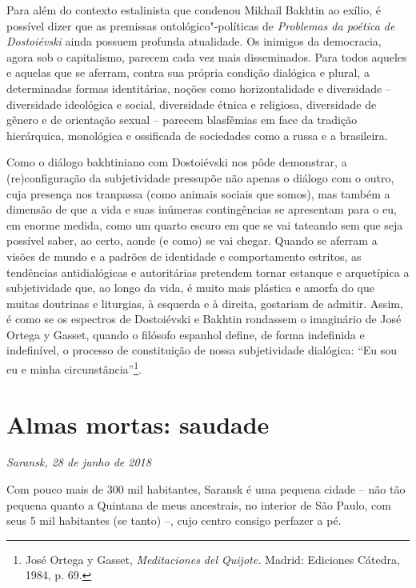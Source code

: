 Para além do contexto estalinista que condenou Mikhail Bakhtin ao
exílio, é possível dizer que as premissas ontológico"-políticas de
\emph{Problemas da poética de Dostoiévski} ainda possuem profunda
atualidade. Os inimigos da democracia, agora sob o capitalismo, parecem
cada vez mais disseminados. Para todos aqueles e aquelas que se aferram,
contra sua própria condição dialógica e plural, a determinadas formas
identitárias, noções como horizontalidade e diversidade -- diversidade
ideológica e social, diversidade étnica e religiosa, diversidade de
gênero e de orientação sexual -- parecem blasfêmias em face da tradição
hierárquica, monológica e ossificada de sociedades como a russa e a
brasileira.

Como o diálogo bakhtiniano com Dostoiévski nos pôde demonstrar, a
(re)configuração da subjetividade pressupõe não apenas o diálogo com o
outro, cuja presença nos tranpassa (como animais sociais que somos), mas
também a dimensão de que a vida e suas inúmeras contingências se
apresentam para o eu, em enorme medida, como um quarto escuro em que se
vai tateando sem que seja possível saber, ao certo, aonde (e como) se
vai chegar. Quando se aferram a visões de mundo e a padrões de
identidade e comportamento estritos, as tendências antidialógicas e
autoritárias pretendem tornar estanque e arquetípica a subjetividade
que, ao longo da vida, é muito mais plástica e amorfa do que muitas
doutrinas e liturgias, à esquerda e à direita, gostariam de admitir.
Assim, é como se os espectros de Dostoiévski e Bakhtin rondassem o
imaginário de José Ortega y Gasset, quando o filósofo espanhol define,
de forma indefinida e indefinível, o processo de constituição de nossa
subjetividade dialógica: ``Eu sou eu e minha circunstância''\footnote{José
  Ortega y Gasset, \emph{Meditaciones del Quijote.} Madrid: Ediciones
  Cátedra, 1984, p. 69.}.

\chapter*{Almas mortas: saudade}

\begin{flushright}
\emph{Saransk, 28 de junho de 2018}
\end{flushright}

Com pouco mais de 300 mil habitantes, Saransk é uma pequena cidade --
não tão pequena quanto a Quintana de meus ancestrais, no interior de São
Paulo, com seus 5 mil habitantes (se tanto) --, cujo centro consigo
perfazer a pé.

